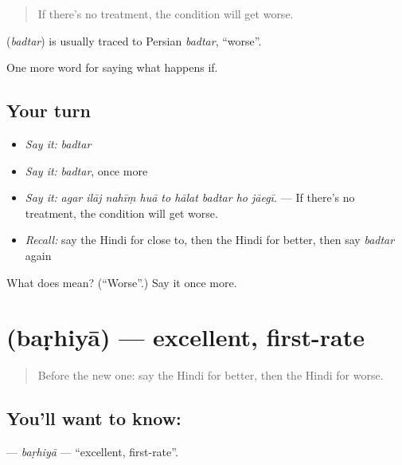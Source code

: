 \begin{quote}
If there's no treatment, the condition will get worse.
\end{quote}

\begin{cousinweb}
\textbf{} (\emph{badtar}) is usually traced to Persian \emph{badtar}, \textquotedblleft{}worse\textquotedblright{}.
\end{cousinweb}

\begin{grammarlens}[title={What you've built}]
One more word for saying what happens if.
\end{grammarlens}

\subsection*{Your turn}
\begin{itemize}
\raggedright
  \item \emph{Say it:} \emph{badtar}
  \item \emph{Say it:} \emph{badtar}, once more
  \item \emph{Say it:} \emph{agar ilāj nahīṃ huā to hālat badtar ho jāegī.} — If there's no treatment, the condition will get worse.
  \item \emph{Recall:} say the Hindi for close to, then the Hindi for better, then say \emph{badtar} again
\end{itemize}

\begin{tcolorbox}[breakable,colback=teal!4,colframe=teal!35!black,title={Before you move on}]
What does  mean? (\textquotedblleft{}Worse\textquotedblright{}.) Say it once more.
\end{tcolorbox}
\section[\texorpdfstring{\hi{बढ़िया} (baṛhiyā)}{बढ़िया (baṛhiyā)}]{ (baṛhiyā) — excellent, first-rate}

\label{lesson:HI-C389-barhiya}



\begin{quote}
Before the new one: say the Hindi for better, then the Hindi for worse.
\end{quote}

\subsection*{You'll want to know: }
\textbf{} — \emph{baṛhiyā} — \textquotedblleft{}excellent, first-rate\textquotedblright{}.

